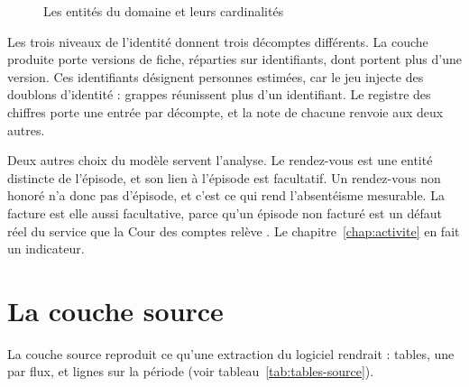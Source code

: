 \begin{figure}[htbp]
\caption{Les entités du domaine et leurs cardinalités}\label{fig:diagramme-classes}
\end{figure}

Les trois niveaux de l'identité donnent trois décomptes différents. La couche produite porte
 versions de fiche, réparties sur 
identifiants, dont  portent plus d'une version. Ces
identifiants désignent  personnes estimées, car le jeu injecte des
doublons d'identité :  grappes réunissent plus d'un identifiant. Le
registre des chiffres porte une entrée par décompte, et la note de chacune renvoie aux deux autres.

Deux autres choix du modèle servent l'analyse. Le rendez-vous est une entité distincte de
l'épisode, et son lien à l'épisode est facultatif. Un rendez-vous non honoré n'a donc pas
d'épisode, et c'est ce qui rend l'absentéisme mesurable. La facture est elle aussi facultative,
parce qu'un épisode non facturé est un défaut réel du service que la Cour des comptes relève
\cite{s20}. Le chapitre~\ref{chap:activite} en fait un indicateur.

\section{La couche source}

La couche source reproduit ce qu'une extraction du logiciel rendrait : 
tables, une par flux, et  lignes sur la période (voir
tableau~\ref{tab:tables-source}).

